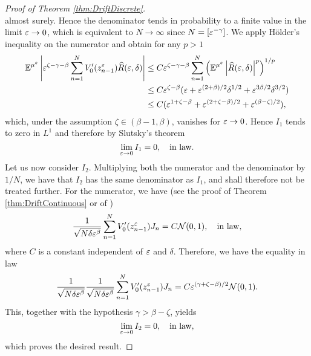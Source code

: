 \documentclass[10pt]{article}
\begin{document}
\begin{proof}[Proof of Theorem \ref{thm:DriftDiscrete}]
\begin{equation}
	\end{equation}
	almost surely. Hence the denominator tends in probability to a finite value in the limit $\varepsilon \to 0$, which is equivalent to $N \to \infty$ since $N = [\varepsilon^{-\gamma}]$. We apply Hölder's inequality on the numerator and obtain for any $p > 1$
	\begin{equation}
	\begin{aligned}
		\operatorname{\mathbb{E}}^{\mu^\varepsilon} \left\lvert\varepsilon^{\zeta-\gamma-\beta} \sum_{n=1}^{N}V_0'(z^\varepsilon_{n-1})\widehat R(\varepsilon, \delta)\right\rvert &\leq C \varepsilon^{\zeta-\gamma-\beta}\sum_{n=1}^{N} \left(\operatorname{\mathbb{E}}^{\mu^\varepsilon} \left\lvert\widehat R(\varepsilon, \delta)\right\rvert^p\right)^{1/p}\\
		&\leq C \varepsilon^{\zeta-\beta}(\varepsilon +  \varepsilon^{(2+\beta)/2}\delta^{1/2} + \varepsilon^{3\beta/2}\delta^{3/2})\\
		&\leq C (\varepsilon^{1+\zeta-\beta} +  \varepsilon^{(2+\zeta-\beta)/2} + \varepsilon^{(\beta-\zeta)/2}),
	\end{aligned}
	\end{equation}
	which, under the assumption $\zeta \in (\beta-1, \beta)$, vanishes for $\varepsilon \to 0$. Hence $I_1$ tends to zero in $L^1$ and therefore by Slutsky's theorem
	\begin{equation}
		\lim_{\varepsilon \to 0} I_1 = 0, \quad \text{in law}.
	\end{equation}
	Let us now consider $I_2$. Multiplying both the numerator and the denominator by $1/N$, we have that $I_2$ has the same denominator as $I_1$, and shall therefore not be treated further. For the numerator, we have (see the proof of Theorem \ref{thm:DriftContinuous} or of \cite[Theorem 3.5]{PaS07})
	\begin{equation}
		\frac{1}{\sqrt{N\delta\varepsilon^\beta}}\sum_{n=1}^{N}V_0'(z^\varepsilon_{n-1})J_n = C\mathcal N(0, 1), \quad \text{in law},
	\end{equation}
	where $C$ is a constant independent of $\varepsilon$ and $\delta$. Therefore, we have the equality in law
	\begin{equation}
		\frac{1}{\sqrt{N\delta \varepsilon^\beta}} \frac{1}{\sqrt{N\delta\varepsilon^\beta}}\sum_{n=1}^{N}V_0'(z^\varepsilon_{n-1})J_n = C\varepsilon^{(\gamma +\zeta - \beta)/2} \mathcal N(0, 1).
	\end{equation} 
	This, together with the hypothesis $\gamma > \beta - \zeta$, yields
	\begin{equation}
		\lim_{\varepsilon \to 0} I_2 = 0, \quad \text{in law},
	\end{equation}
	which proves the desired result.
\end{proof}
\end{document}
